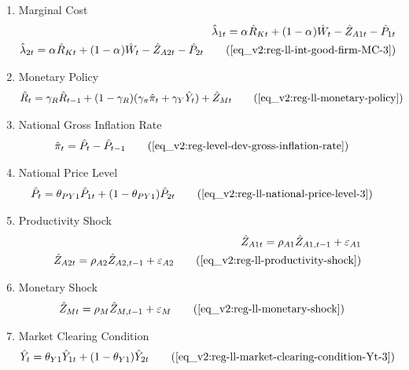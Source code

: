\documentclass[../thesis.tex]{subfiles}
\begin{document}
{\begin{enumerate}

		
		\item Marginal Cost
		\begin{alignat}{2}
			\hat{\lambda}_{1 t} = {\alpha_{}} \hat{R}_{Kt} + (1- {\alpha_{}}) \hat{W}_{t} - \hat{Z}_{A1 t} - \hat{P}_{1 t} \nonumber \\
			\hat{\lambda}_{2 t} = {\alpha_{}} \hat{R}_{Kt} + (1- {\alpha_{}}) \hat{W}_{t} - \hat{Z}_{A2 t} - \hat{P}_{2 t} \tag{\ref{eq_v2:reg-ll-int-good-firm-MC-3}}
		\end{alignat}
		
		\item Monetary Policy
		\begin{align}
			& \hat{R}_t = \gamma_R \hat{R}_{t-1} + (1-\gamma_R)(\gamma_\pi \hat{\pi}_t + \gamma_Y \hat{Y}_t) + \hat{Z}_{Mt} \tag{\ref{eq_v2:reg-ll-monetary-policy}}
		\end{align}
		
		\item National Gross Inflation Rate
		\begin{align}
			\hat{\pi}_{t} &= \hat{P}_{t} - \hat{P}_{t-1} \tag{\ref{eq_v2:reg-level-dev-gross-inflation-rate}}
		\end{align}
		
		\item National Price Level
		\begin{alignat}{2}
			\hat{P}_{t} &= \theta_{PY1} \hat{P}_{1t} + (1-\theta_{PY1}) \hat{P}_{2t} \tag{\ref{eq_v2:reg-ll-national-price-level-3}}
		\end{alignat}
		
		\item Productivity Shock
		\begin{alignat}{2}
			\hat{Z}_{A1 t} = \rho_{A1} \hat{Z}_{A1, t-1} + \varepsilon_{A1} \nonumber \\
			\hat{Z}_{A2 t} = \rho_{A2} \hat{Z}_{A2, t-1} + \varepsilon_{A2} \tag{\ref{eq_v2:reg-ll-productivity-shock}}
		\end{alignat}
		
		\item Monetary Shock
		\begin{alignat}{2}
			\hat{Z}_{Mt} &= \rho_M \hat{Z}_{M,t-1} + \varepsilon_{M} \tag{\ref{eq_v2:reg-ll-monetary-shock}}
		\end{alignat}
		
		\item Market Clearing Condition
		\begin{align}
			\hat{Y}_{t} &= \theta_{Y1} \hat{Y}_{1t} + (1-\theta_{Y1}) \hat{Y}_{2t} \tag{\ref{eq_v2:reg-ll-market-clearing-condition-Yt-3}}
		\end{align}
		

\end{enumerate}}
\end{document}
